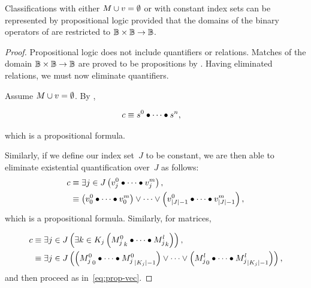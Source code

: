 \begin{theorem}
  Classifications with either $M\cup v=\emptyset$ or with constant index
    sets can be represented by propositional logic provided that the domains
    of the binary operators of  are restricted to
    $\mathbb{B}\times\mathbb{B}\rightarrow\mathbb{B}$.
\end{theorem}
\begin{proof}
  Propositional logic does not include quantifiers or relations.
  Matches of the domain $\mathbb{B}\times\mathbb{B}\rightarrow\mathbb{B}$ are proved to be propositions by
    .
  Having eliminated relations,
    we must now eliminate quantifiers.

  Assume $M\cup v=\emptyset$.
  By ,

  \begin{align*}
    c &\equiv s^0\bullet\cdots\bullet s^n,
  \end{align*}

  \noindent
  which is a propositional formula.

  Similarly,
    if we define our index set~$J$ to be constant,
      we are then able to eliminate existential quantification over~$J$
      as follows:
  \begin{equation}\label{eq:prop-vec}
  \begin{aligned}
    c &\equiv \Exists{j\in J}{\cpredvecseq}, \\
      &\equiv \left(v^0_0\bullet\cdots\bullet v^m_0\right)
              \lor\cdots\lor
              \left(v^0_{|J|-1}\bullet\cdots\bullet v^m_{|J|-1}\right),
  \end{aligned}
  \end{equation}
  which is a propositional formula.
  Similarly,
    for matrices,

  \begin{align*}
    c &\equiv \Exists{j\in J}{\Exists{k\in K_j}{\cpredmatseq}}, \nonumber\\
      &\equiv \Exists{j\in J}{
                \left({M^0_j}_0\bullet\cdots\bullet{M^0_j}_{|K_j|-1}\right)
                \lor\cdots\lor
                \left({M^l_j}_0\bullet\cdots\bullet{M^l_j}_{|K_j|-1}\right)
              },
  \end{align*}
  and then proceed as in~\ref{eq:prop-vec}.
\end{proof}
